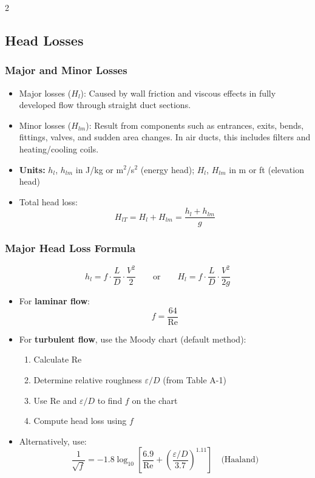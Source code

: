 \begin{multicols*}{2}
    \subsection{Head Losses}

    \subsubsection{Major and Minor Losses}
    \begin{itemize}
        \item Major losses ($H_l$): Caused by wall friction and viscous effects in fully developed flow through straight duct sections.
        \item Minor losses ($H_{lm}$): Result from components such as entrances, exits, bends, fittings, valves, and sudden area changes. In air ducts, this includes filters and heating/cooling coils.
        \item \textbf{Units:} $h_l$, $h_{lm}$ in J/kg or m$^2$/s$^2$ (energy head); $H_l$, $H_{lm}$ in m or ft (elevation head)
        \item Total head loss:
              \[
                  H_{lT} = H_l + H_{lm} = \frac{h_l + h_{lm}}{g}
              \]
    \end{itemize}

    \subsubsection{Major Head Loss Formula}
    \[
        h_l = f \cdot \frac{L}{D} \cdot \frac{V^2}{2} \qquad \text{or} \qquad
        H_l = f \cdot \frac{L}{D} \cdot \frac{V^2}{2g}
    \]
    \begin{itemize}
        \item For \textbf{laminar flow}:
              \[
                  f = \frac{64}{\text{Re}}
              \]
        \item For \textbf{turbulent flow}, use the Moody chart (default method):
              \begin{enumerate}
                  \item Calculate $\text{Re}$
                  \item Determine relative roughness $\varepsilon/D$ (from Table A-1)
                  \item Use $\text{Re}$ and $\varepsilon/D$ to find $f$ on the chart
                  \item Compute head loss using $f$
              \end{enumerate}
        \item Alternatively, use:
              \[
                  \frac{1}{\sqrt{f}} = -1.8 \log_{10} \left[ \frac{6.9}{\text{Re}} + \left( \frac{\varepsilon/D}{3.7} \right)^{1.11} \right] \quad \text{(Haaland)}
              \]
    \end{itemize}


\end{multicols*}
